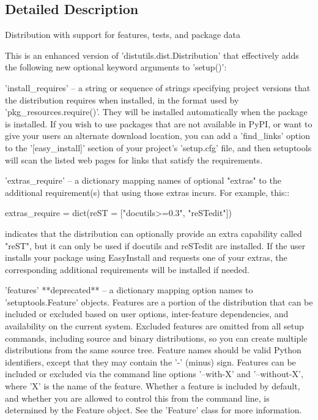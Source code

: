 \subsection{Detailed Description}
\begin{DoxyVerb}Distribution with support for features, tests, and package data

This is an enhanced version of 'distutils.dist.Distribution' that
effectively adds the following new optional keyword arguments to 'setup()':

 'install_requires' -- a string or sequence of strings specifying project
    versions that the distribution requires when installed, in the format
    used by 'pkg_resources.require()'.  They will be installed
    automatically when the package is installed.  If you wish to use
    packages that are not available in PyPI, or want to give your users an
    alternate download location, you can add a 'find_links' option to the
    '[easy_install]' section of your project's 'setup.cfg' file, and then
    setuptools will scan the listed web pages for links that satisfy the
    requirements.

 'extras_require' -- a dictionary mapping names of optional "extras" to the
    additional requirement(s) that using those extras incurs. For example,
    this::

        extras_require = dict(reST = ["docutils>=0.3", "reSTedit"])

    indicates that the distribution can optionally provide an extra
    capability called "reST", but it can only be used if docutils and
    reSTedit are installed.  If the user installs your package using
    EasyInstall and requests one of your extras, the corresponding
    additional requirements will be installed if needed.

 'features' **deprecated** -- a dictionary mapping option names to
    'setuptools.Feature'
    objects.  Features are a portion of the distribution that can be
    included or excluded based on user options, inter-feature dependencies,
    and availability on the current system.  Excluded features are omitted
    from all setup commands, including source and binary distributions, so
    you can create multiple distributions from the same source tree.
    Feature names should be valid Python identifiers, except that they may
    contain the '-' (minus) sign.  Features can be included or excluded
    via the command line options '--with-X' and '--without-X', where 'X' is
    the name of the feature.  Whether a feature is included by default, and
    whether you are allowed to control this from the command line, is
    determined by the Feature object.  See the 'Feature' class for more
    information.


\end{DoxyVerb}
